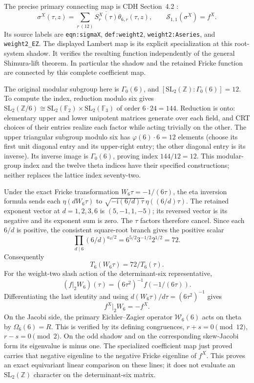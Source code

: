 The precise primary connecting map is CDH
Section~4.2 \cite[Section~4.2]{esn:CDH2014}:
\[
 \sigma^X(\tau,z)=\sum_{r\ (12)}\overline{S_r^X(\tau)}
                                \theta_{6,r}(\tau,z),\qquad
 \mathscr S_{1,1}(\sigma^X)=f^X.
\]
Its source labels are \texttt{eqn:sigmaX}, \texttt{def:weight2},
\texttt{weight2:Aseries}, and \texttt{weight2\_EZ}.
The displayed Lambert map is its explicit specialization at this
root-system shadow.  It verifies the resulting function independently
of the general Shimura-lift theorem.  In particular the shadow and the
retained Fricke function are connected by this complete coefficient map.

The original modular subgroup here is $\Gamma_0(6)$, and
$[\mathrm{SL}_2(\mathbb Z):\Gamma_0(6)]=12$.  To compute the index,
reduction modulo six gives
$\mathrm{SL}_2(\mathbb Z/6)\cong
\mathrm{SL}_2(\mathbb F_2)\times\mathrm{SL}_2(\mathbb F_3)$ of
order $6\cdot24=144$.  Reduction is onto: elementary upper and lower
unipotent matrices generate over each field, and CRT choices of their
entries realize each factor while acting trivially on the other.
The upper triangular subgroup modulo six has $\varphi(6)\cdot6=12$
elements (choose its first unit diagonal entry and its upper-right entry;
the other diagonal entry is its inverse).  Its inverse image is
$\Gamma_0(6)$, proving index $144/12=12$.
This modular-group index and the twelve theta indices have their
specified constructions; neither replaces the lattice index seventy-two.

Under the exact Fricke transformation $W_6\tau=-1/(6\tau)$,
the eta inversion formula sends each $\eta(dW_6\tau)$ to
$\sqrt{-\mathrm i(6/d)\tau}\,\eta((6/d)\tau)$.
The retained exponent vector at $d=1,2,3,6$ is $(5,-1,1,-5)$;
its reversed vector is its negative and its exponent sum is zero.
The $\tau$ factors therefore cancel.  Since each $6/d$ is positive,
the consistent square-root branch gives the positive scalar
\[
 \prod_{d\mid6}(6/d)^{a_d/2}
 =6^{5/2}3^{-1/2}2^{1/2}=72.
\]
Consequently
\[
 \boxed{T_6(W_6\tau)=72/T_6(\tau).}
\]
For the weight-two slash action of the determinant-six representative,
\[
 (f|_2W_6)(\tau)=(6\tau^2)^{-1}f(-1/(6\tau)).
\]
Differentiating the last identity and using
$d(W_6\tau)/d\tau=(6\tau^2)^{-1}$ gives
\[
 \boxed{f^X|_2W_6=-f^X.}
\]
On the Jacobi side, the primary Eichler--Zagier operator
$\mathcal W_6(6)$ acts on theta by $\Omega_6(6)=R$.
This is verified by its defining congruences, $r+s=0\pmod{12}$,
$r-s=0\pmod2$.  On the odd shadow and on the corresponding
skew-Jacobi form its eigenvalue is minus one.  The specialized coefficient
map just proved carries that negative eigenline to the negative Fricke
eigenline of $f^X$.  This proves an exact equivariant linear comparison
on these lines; it does not evaluate an $\mathrm{SL}_2(\mathbb Z)$
character on the determinant-six matrix.


